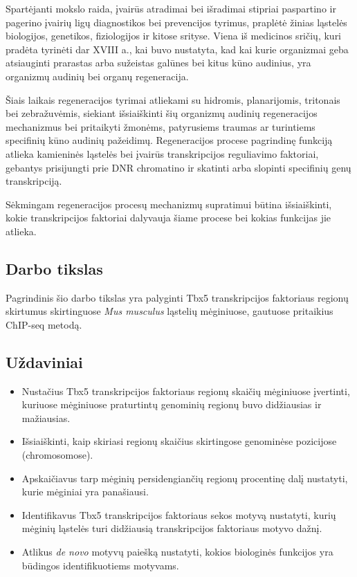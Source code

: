 \documentclass[12pt]{article}
\begin{document}
Spartėjanti mokslo raida, įvairūs atradimai bei išradimai stipriai paspartino
ir pagerino įvairių ligų diagnostikos bei prevencijos tyrimus, praplėtė žinias
ląstelės biologijos, genetikos, fiziologijos ir kitose srityse. Viena iš
medicinos sričių, kuri pradėta tyrinėti dar XVIII a., kai buvo nustatyta, kad
kai kurie organizmai geba atsiauginti prarastas arba sužeistas galūnes bei
kitus kūno audinius\cite{REGENERATION}, yra organizmų audinių bei organų
regeneracija.

Šiais laikais regeneracijos tyrimai atliekami su hidromis, planarijomis,
tritonais bei zebražuvėmis\cite{ORGANISMS}, siekiant išsiaiškinti šių organizmų
audinių regeneracijos mechanizmus bei pritaikyti žmonėms, patyrusiems traumas
ar turintiems specifinių kūno audinių pažeidimų. Regeneracijos procese
pagrindinę funkciją atlieka kamieninės ląstelės bei įvairūs transkripcijos
reguliavimo faktoriai, gebantys prisijungti prie DNR chromatino ir skatinti
arba slopinti specifinių genų transkripciją.

Sėkmingam regeneracijos procesų mechanizmų supratimui būtina išsiaiškinti, 
kokie transkripcijos faktoriai dalyvauja šiame procese bei kokias funkcijas jie
atlieka.

\subsection*{Darbo tikslas}

Pagrindinis šio darbo tikslas yra palyginti Tbx5 transkripcijos faktoriaus
regionų skirtumus skirtinguose \emph{Mus musculus} ląstelių mėginiuose,
gautuose pritaikius ChIP-seq metodą.

\subsection*{Uždaviniai}
\begin{itemize}
    \item Nustačius Tbx5 transkripcijos faktoriaus regionų skaičių mėginiuose
    įvertinti, kuriuose mėginiuose praturtintų genominių regionų buvo
    didžiausias ir mažiausias.
    \item Išsiaiškinti, kaip skiriasi regionų skaičius skirtingose genominėse
    pozicijose (chromosomose).
    \item Apskaičiavus tarp mėginių persidengiančių regionų procentinę dalį
    nustatyti, kurie mėginiai yra panašiausi.
    \item Identifikavus Tbx5 transkripcijos faktoriaus sekos motyvą nustatyti,
    kurių mėginių ląstelės turi didžiausią transkripcijos faktoriaus motyvo
    dažnį.
    \item Atlikus \emph{de novo} motyvų paiešką nustatyti, kokios biologinės
    funkcijos yra būdingos identifikuotiems motyvams.
\end{itemize}
\end{document}

